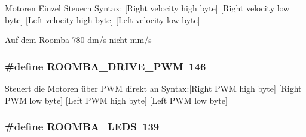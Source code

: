 Motoren Einzel Steuern Syntax\-: \mbox{[}Right velocity high byte\mbox{]} \mbox{[}Right velocity low byte\mbox{]} \mbox{[}Left velocity high byte\mbox{]} \mbox{[}Left velocity low byte\mbox{]}

Auf dem Roomba 780 dm/s nicht mm/s \hypertarget{group__roomba__commands__motor_ga513cf01360599037868593fc9525bd6e}{
\subsubsection[{R\-O\-O\-M\-B\-A\-\_\-\-D\-R\-I\-V\-E\-\_\-\-P\-W\-M}]{\setlength{\rightskip}{0pt plus 5cm}\#define R\-O\-O\-M\-B\-A\-\_\-\-D\-R\-I\-V\-E\-\_\-\-P\-W\-M~146}}\label{group__roomba__commands__motor_ga513cf01360599037868593fc9525bd6e}
Steuert die Motoren über P\-W\-M direkt an Syntax\-:\mbox{[}Right P\-W\-M high byte\mbox{]} \mbox{[}Right P\-W\-M low byte\mbox{]} \mbox{[}Left P\-W\-M high byte\mbox{]} \mbox{[}Left P\-W\-M low byte\mbox{]} \hypertarget{group__roomba__commands__motor_gab8173cfeebe0443357775116393d5964}{
\subsubsection[{R\-O\-O\-M\-B\-A\-\_\-\-L\-E\-D\-S}]{\setlength{\rightskip}{0pt plus 5cm}\#define R\-O\-O\-M\-B\-A\-\_\-\-L\-E\-D\-S~139}}\label{group__roomba__commands__motor_gab8173cfeebe0443357775116393d5964}
